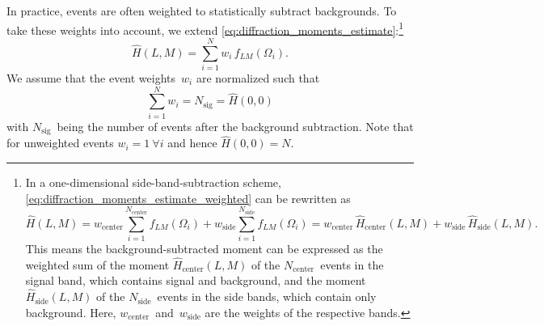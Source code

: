 In practice, events are often weighted to statistically subtract
backgrounds.  To take these weights into account, we extend
\cref{eq:diffraction_moments_estimate}:\footnote{In a one-dimensional
side-band-subtraction scheme,
\cref{eq:diffraction_moments_estimate_weighted} can be rewritten as
\begin{equation}
  \hat{H}(L, M)
  = w_\text{center} \sum_{i = 1}^{N_\text{center}} f_{L M}(\Omega_i)
  + w_\text{side}   \sum_{i = 1}^{N_\text{side}}   f_{L M}(\Omega_i)
  = w_\text{center}\, \hat{H}_\text{center}(L, M)
  + w_\text{side}\,   \hat{H}_\text{side}(L, M).
\end{equation}
This means the background-subtracted moment can be expressed as the
weighted sum of the moment $\hat{H}_\text{center}(L, M)$ of the
$N_\text{center}$~events in the signal band, which contains signal and
background, and the moment $\hat{H}_\text{side}(L, M)$ of the
$N_\text{side}$~events in the side bands, which contain only
background.  Here, $w_\text{center}$~and~$w_\text{side}$ are the
weights of the respective bands.}
\begin{equation}
  \label{eq:diffraction_moments_estimate_weighted}
  \hat{H}(L, M)
  = \sum_{i = 1}^N w_i\, f_{L M}(\Omega_i).
\end{equation}
We assume that the event weights~$w_i$ are normalized such that
\begin{equation}
  \label{eq:event_weights_norm}
  \sum_{i = 1}^N w_i
  = N_\text{sig}
  = \hat{H}(0, 0)
\end{equation}
with $N_\text{sig}$~being the number of events after the background
subtraction.  Note that for unweighted events $w_i = 1~ \forall i$ and
hence $\hat{H}(0, 0) = N$.

